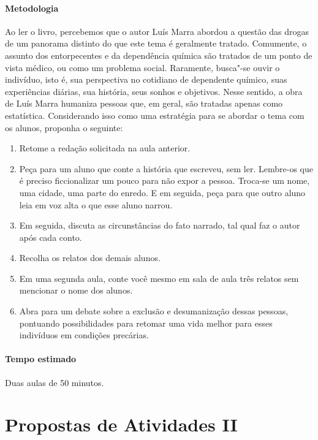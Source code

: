 \documentclass[12pt]{extarticle}
\begin{document}
\paragraph{Metodologia}
	Ao ler o livro, percebemos que o autor Luís Marra abordou a
	questão das drogas de um panorama distinto do que este tema é geralmente
	tratado. Comumente, o assunto dos entorpecentes e da dependência química
	são tratados de um ponto de vista médico, ou como um problema social.
	Raramente, busca"-se ouvir o indivíduo, isto é, sua perspectiva no
	cotidiano de dependente químico, suas experiências diárias, sua
	história, seus sonhos e objetivos. Nesse sentido, a obra de Luís Marra
	humaniza pessoas que, em geral, são tratadas apenas como estatística. 
	Considerando isso como uma estratégia para se abordar o tema 
	com os alunos, proponha o seguinte: 
\begin{enumerate}
	\item Retome a redação solicitada na aula anterior. 
	\item Peça para um aluno que conte a história que escreveu, sem ler. 
	Lembre-os que é preciso ficcionalizar um pouco para não expor a pessoa. 
	Troca-se um nome, uma cidade, uma parte do enredo. 
	E em seguida, peça para que outro aluno leia em voz alta o que 
	esse aluno narrou.
	\item Em seguida, discuta as circunstâncias do fato narrado, 
	tal qual faz o autor após cada conto. 
	\item Recolha os relatos dos demais alunos. 
	\item Em uma segunda aula, conte você mesmo em sala de aula 
	três relatos sem mencionar o nome dos alunos. 
	\item Abra para um debate sobre a exclusão e desumanização 
	dessas pessoas, pontuando possibilidades para retomar uma vida 
	melhor para esses indivíduos em condições precárias.
\end{enumerate}
\paragraph{Tempo estimado} Duas aulas de 50 minutos. 

\section{Propostas de Atividades II}

\end{document}
